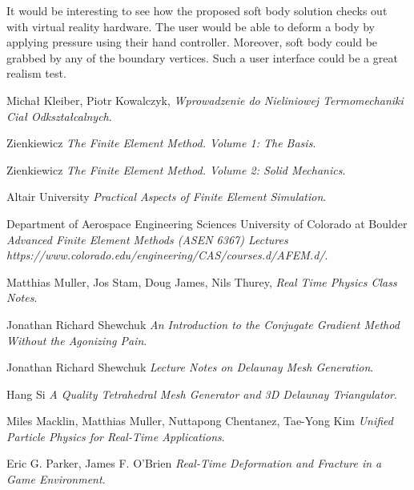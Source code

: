 \documentclass[en]{minipw} %
\begin{document}
It would be interesting to see how the proposed soft body solution checks out with virtual reality hardware. The user would be able to deform a body by applying pressure using their hand controller. Moreover, soft body could be grabbed by any of the boundary vertices. Such a user interface could be a great realism test.



\begin{thebibliography}{25}%


 Michał Kleiber, Piotr Kowalczyk, \emph{Wprowadzenie do Nieliniowej Termomechaniki Ciał Odkształcalnych}.

 Zienkiewicz \emph{The Finite Element Method. Volume 1: The Basis}.

 Zienkiewicz \emph{The Finite Element Method. Volume 2: Solid Mechanics}.

 Altair University \emph{Practical Aspects of Finite Element Simulation}.

 Department of Aerospace Engineering Sciences University of Colorado at Boulder \emph{Advanced Finite Element Methods (ASEN 6367) Lectures https://www.colorado.edu/engineering/CAS/courses.d/AFEM.d/}.


 Matthias Muller, Jos Stam, Doug James, Nils Thurey, \emph{Real Time Physics Class Notes}.

 Jonathan Richard Shewchuk \emph{An Introduction to the Conjugate Gradient Method Without the Agonizing Pain}.

 Jonathan Richard Shewchuk \emph{Lecture Notes on Delaunay Mesh Generation}.

 Hang Si \emph{A Quality Tetrahedral Mesh Generator and 3D Delaunay Triangulator}.


 Miles Macklin, Matthias Muller, Nuttapong Chentanez, Tae-Yong Kim \emph{Unified Particle Physics for Real-Time Applications}.

 Eric G. Parker, James F. O'Brien \emph{Real-Time Deformation and Fracture in a Game Environment}.


\end{thebibliography}
\end{document}
